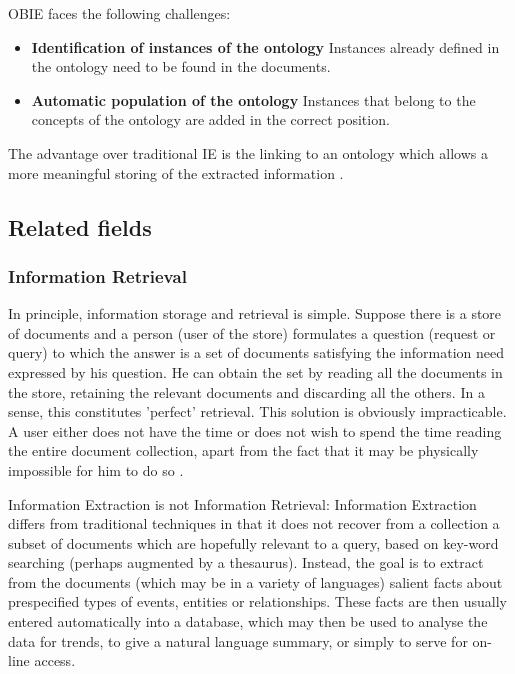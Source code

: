 \gls{OBIE} faces the following challenges:

\begin{itemize}
\item \textbf{Identification of instances of the ontology} \newline
Instances already defined in the ontology need to be found in the documents.
\item \textbf{Automatic population of the ontology} \newline
Instances that belong to the concepts of the ontology are added in the correct position.
\end{itemize}

The advantage over traditional IE is the linking to an ontology which allows a more meaningful storing of the extracted information \cite{Maynard:2005}.

\newpage
\subsection{Related fields}

\subsubsection{Information Retrieval}
In principle, information storage and retrieval is simple. Suppose there is a store of documents and a person (user of the store) formulates a question (request or query) to which the answer is a set of documents satisfying the information need expressed by his question. He can obtain the set by reading all the documents in the store, retaining the relevant documents and discarding all the others. In a sense, this constitutes 'perfect' retrieval. This solution is obviously impracticable. A user either does not have the time or does not wish to spend the time reading the entire document collection, apart from the fact that it may be physically impossible for him to do so \cite{Rijsbergen:1979}.

Information Extraction is not Information Retrieval: Information Extraction differs from traditional techniques in that it does not recover from a collection a subset of documents which are hopefully relevant to a query, based on key-word searching (perhaps augmented by a thesaurus). Instead, the goal is to extract from the documents (which may be in a variety of languages) salient facts about prespecified types of events, entities or relationships. These facts are then usually entered automatically into a database, which may then be used to analyse the data for trends, to give a natural language summary, or simply to serve for on-line access. \cite{GATE:IE}

